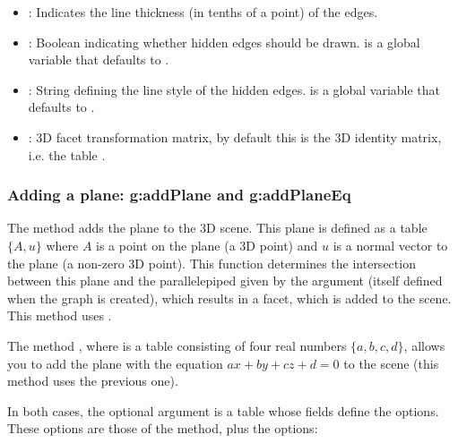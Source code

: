 \begin{itemize}
    \item {}: Indicates the line thickness (in tenths of a point) of the edges.

    \item {}: Boolean indicating whether hidden edges should be drawn.  is a global variable that defaults to \false.

    \item {}: String defining the line style of the hidden edges.  is a global variable that defaults to .

     \item {}: 3D facet transformation matrix, by default this is the 3D identity matrix, i.e. the table .
\end{itemize}


\subsubsection{Adding a plane: g:addPlane and g:addPlaneEq}

The  method adds the plane  to the 3D scene. This plane is defined as a table $\{A,u\}$ where $A$ is a point on the plane (a 3D point) and $u$ is a normal vector to the plane (a non-zero 3D point). This function determines the intersection between this plane and the parallelepiped given by the  argument (itself defined when the graph is created), which results in a facet, which is added to the scene. This method uses .

The method , where  is a table consisting of four real numbers $\{a,b,c,d\}$, allows you to add the plane with the equation $ax+by+cz+d=0$ to the scene (this method uses the previous one).

In both cases, the optional argument  is a table whose fields define the options. These options are those of the  method, plus the options:

